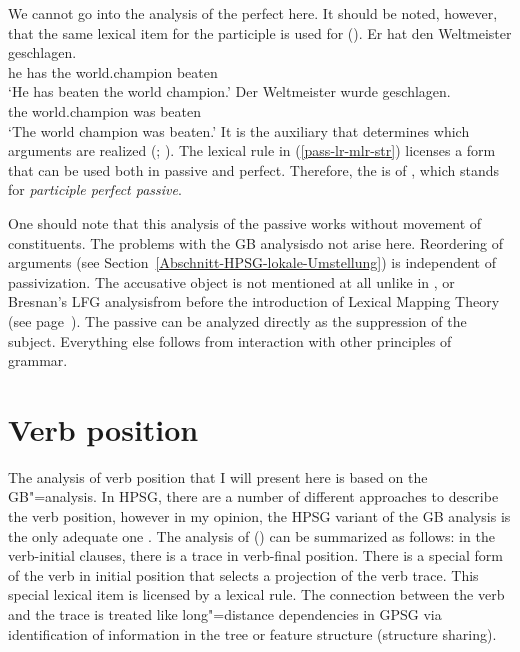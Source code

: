 We cannot go into the analysis of the perfect here. It should be noted, however, that the same lexical
item for the participle is
used for ().
\eal
\ex 
\gll Er hat den Weltmeister geschlagen.\\
	 he has the world.champion beaten\\
\glt `He has beaten the world champion.'
\ex 
\gll Der Weltmeister wurde geschlagen.\\
	 the world.champion was beaten\\
\glt `The world champion was beaten.'
\zl
It is the auxiliary that determines which arguments are realized (\citealp{Haider86}; \citealp[Chapter~17]{MuellerLehrbuch1}).
The lexical rule in (\ref{pass-lr-mlr-str}) licenses a form that can be used both in passive and perfect. Therefore, the
\vformv is of , which stands for \emph{participle perfect passive}.

One should note that this analysis of the passive works without movement of constituents. The problems with the GB analysis\indexgb do not arise here.
Reordering of arguments (see Section~\ref{Abschnitt-HPSG-lokale-Umstellung}) is independent of passivization. The accusative object is not mentioned
at all unlike in \gpsg, \cg or Bresnan's LFG analysis\indexlfg from before the introduction of
Lexical Mapping Theory (see page~\pageref{page-LMT}). The passive can be analyzed directly as the suppression of the subject. Everything else follows from interaction with other principles of grammar.

\section{Verb position}
\label{Abschnitt-Verbstellung-HPSG}

\addlines[2]
The analysis of verb position that I will present here is based on the GB"=analysis. In HPSG, there are a number of different approaches
to describe the verb position, however in my opinion, the HPSG variant of the GB analysis is the only adequate one \citep{Mueller2005c,Mueller2005d,MuellerGS}.
The analysis of () can be summarized as follows: in the verb-initial clauses, there is a trace in verb-final position. There is a special form of the 
verb in initial position that selects a projection of the verb trace. This special lexical item is licensed by a lexical rule. The connection between the
verb and the trace is treated like long"=distance dependencies in GPSG via identification of information in the tree or feature structure (structure sharing).

